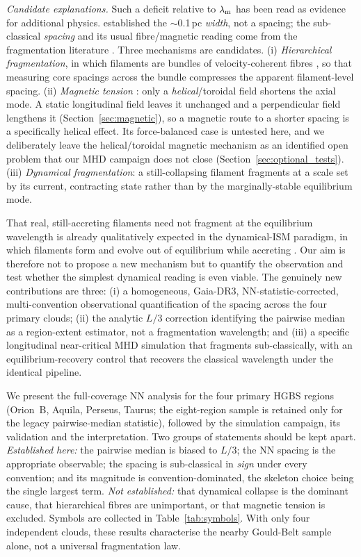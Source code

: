 \documentclass[usenatbib,twoside,twocolumn]{mnras}
\begin{document}
\emph{Candidate explanations.} Such a deficit relative to $\lambda_{\rm m}$ has been read as evidence for additional physics. \citet{Arzoumanian2019} established the $\sim$0.1\,pc \emph{width}, not a spacing; the sub-classical \emph{spacing} and its usual fibre/magnetic reading come from the fragmentation literature \citep{Fischera2012,Zhang2023cal}. Three mechanisms are candidates. (i) \emph{Hierarchical fragmentation}, in which filaments are bundles of velocity-coherent fibres \citep{Hacar2013,Hacar2018,Yang2024}, so that measuring core spacings across the bundle compresses the apparent filament-level spacing. (ii) \emph{Magnetic tension} \citep{Nakamura1993}: only a \emph{helical}/toroidal field shortens the axial mode. A static longitudinal field leaves it unchanged and a perpendicular field lengthens it (Section~\ref{sec:magnetic}), so a magnetic route to a shorter spacing is a specifically helical effect. Its force-balanced case is untested here, and we deliberately leave the helical/toroidal magnetic mechanism as an identified open problem that our MHD campaign does not close (Section~\ref{sec:optional_tests}). (iii) \emph{Dynamical fragmentation}: a still-collapsing filament fragments at a scale set by its current, contracting state rather than by the marginally-stable equilibrium mode.

That real, still-accreting filaments need not fragment at the equilibrium wavelength is already qualitatively expected in the dynamical-ISM paradigm, in which filaments form and evolve out of equilibrium while accreting \citep{Andre2014,Clarke2016,Clarke2017,Clarke2020}. Our aim is therefore not to propose a new mechanism but to quantify the observation and test whether the simplest dynamical reading is even viable. The genuinely new contributions are three: (i) a homogeneous, Gaia-DR3, NN-statistic-corrected, multi-convention observational quantification of the spacing across the four primary clouds; (ii) the analytic $L/3$ correction identifying the pairwise median as a region-extent estimator, not a fragmentation wavelength; and (iii) a specific longitudinal near-critical MHD simulation that fragments sub-classically, with an equilibrium-recovery control that recovers the classical wavelength under the identical pipeline.

We present the full-coverage NN analysis for the four primary HGBS regions (Orion~B, Aquila, Perseus, Taurus; the eight-region sample is retained only for the legacy pairwise-median statistic), followed by the simulation campaign, its validation and the interpretation. Two groups of statements should be kept apart. \emph{Established here:} the pairwise median is biased to $L/3$; the NN spacing is the appropriate observable; the spacing is sub-classical in \emph{sign} under every convention; and its magnitude is convention-dominated, the skeleton choice being the single largest term. \emph{Not established:} that dynamical collapse is the dominant cause, that hierarchical fibres are unimportant, or that magnetic tension is excluded. Symbols are collected in Table~\ref{tab:symbols}. With only four independent clouds, these results characterise the nearby Gould-Belt sample alone, not a universal fragmentation law.
\end{document}
